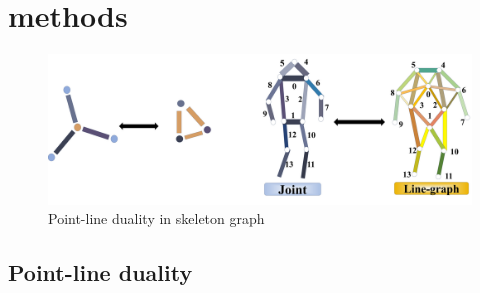 \section{methods}

\begin{figure}[t]
    \centering
    \includegraphics[width=\textwidth]{figure/line-graph.png}
    \caption{Point-line duality in skeleton graph}
    \label{fig:line-graph}
\end{figure}

\subsection{Point-line duality}